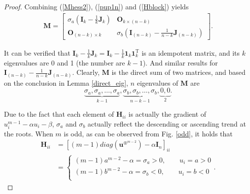 \begin{proof}
 

Combining  (\ref{Mhess2}), (\ref{pup1n}) and  (\ref{Hblock})  yields
\begin{align}
\mathbf {M}
= 
\begin{bmatrix}
 \sigma_{a} 	(\mathbf I_{k} -\frac 1k \mathbf J_{k})    &  \mathbf O_{k \times (n-k)}   \\  
\mathbf O_{(n-k) \times k }   &      \sigma_{b}	(\mathbf I_{(n-k)} - \frac {1}{n-k} \mathbf J_{(n-k)}) 
\end{bmatrix} . 
\end{align}

It can  be  verified that  $  \mathbf I_{k} -\frac 1k \mathbf J_{k} 
= \mathbf I_{k} -\frac 1k \mathbf 1_{k}  \mathbf 1_{k}^{\mathrm T} $  is  an   idempotent matrix, and  its $k$ eigenvalues are    0  and  1 (the number are $k-1$). 
And  similar  results for  $ \mathbf I_{(n-k)} - \frac {1}{n-k} \mathbf J_{(n-k)}$.
Clearly,  $\mathbf M $  is  the  direct  sum  of  two   matrices, 
and based on the  conclusion in  Lemma  \ref{direct_eig}, 
  $n$  eigenvalues  of  $\mathbf M$   are    %
\begin{equation}\label{eigensign} 
\underbrace{
	 \sigma_{a}  ,  \sigma_{a},  \dots,   \sigma_{a} }_{k-1},
\underbrace{
	 \sigma_{b}  ,  \sigma_{b},  \dots,   \sigma_{b}  }_{n-k-1}, 
\underbrace{
0, 0}_{2}. 
\end{equation}




Due to the  fact  that 
each element of  $ \mathbf H _{ii} $ 
is  actually 
the gradient of 
$ u_{i}^{m-1} -\alpha u_{i} - \beta $,
$ \sigma_{a}$ and $ \sigma_{b}$ 
actually  reflect 
the descending or ascending 
trend  at the roots.
When $m$ is odd,  as     can be  observed  from  Fig. \ref{odd}, 
it holds that 
\begin{align}%
\mathbf H _{ii} 
&=   
[ (m-1) diag (\mathbf u ^{\circledast^{m-2}})
-\alpha \mathbf  I_{n}  ] _{ii} 
\nonumber 
\\
&=
\begin{cases}
(m-1) a^{m-2}-\alpha = \sigma_{a} >0  ,  \quad  \quad    u_{i}=a  >0    \\
(m-1) b^{m-2}-\alpha = \sigma_{b} <0  ,  \quad  \quad    u_{i}=b    <0  \\
\end{cases}  .
\end{align}



\end{proof}
